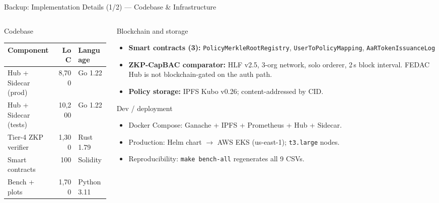\documentclass[aspectratio=169,11pt]{beamer}
\newcommand{\tightitems}{%
  \setlength{\topsep}{2pt}%
  \setlength{\itemsep}{4pt}%
  \setlength{\parsep}{0pt}%
}
\begin{document}
{%
\begin{frame}[noframenumbering]{Backup: Implementation Details (1/2) — Codebase \& Infrastructure}
\vspace{6pt}
\begin{columns}[T,onlytextwidth]
\begin{column}{0.49\textwidth}
\begin{callout}{Codebase}
\scriptsize
\setlength{\tabcolsep}{5pt}
\renewcommand{\arraystretch}{1.2}
\begin{tabular}{l r l}
\toprule
Component & LoC & Language \\
\midrule
Hub + Sidecar (prod)  & 8{,}700  & Go 1.22 \\
Hub + Sidecar (tests) & 10{,}200 & Go 1.22 \\
Tier-4 ZKP verifier   & 1{,}300  & Rust 1.79 \\
Smart contracts       & 100      & Solidity \\
Bench + plots         & 1{,}700  & Python 3.11 \\
\bottomrule
\end{tabular}
\end{callout}
\end{column}
\begin{column}{0.49\textwidth}
\begin{callout}{Blockchain and storage}
\scriptsize
\begin{itemize}\tightitems
\item \textbf{Smart contracts (3):} \texttt{PolicyMerkleRootRegistry}, \texttt{UserToPolicyMapping}, \texttt{AaRTokenIssuanceLog}
\item \textbf{ZKP-CapBAC comparator:} HLF v2.5, 3-org network, solo orderer, 2\,s block interval. FEDAC Hub is not blockchain-gated on the auth path.
\item \textbf{Policy storage:} IPFS Kubo v0.26; content-addressed by CID.
\end{itemize}
\end{callout}
\vspace{6pt}
\begin{callout}{Dev / deployment}
\scriptsize
\begin{itemize}\tightitems
\item Docker Compose: Ganache + IPFS + Prometheus + Hub + Sidecar.
\item Production: Helm chart $\to$ AWS EKS (us-east-1); \texttt{t3.large} nodes.
\item Reproducibility: \texttt{make bench-all} regenerates all 9 CSVs.
\end{itemize}
\end{callout}
\end{column}
\end{columns}
\end{frame}

}
\end{document}
